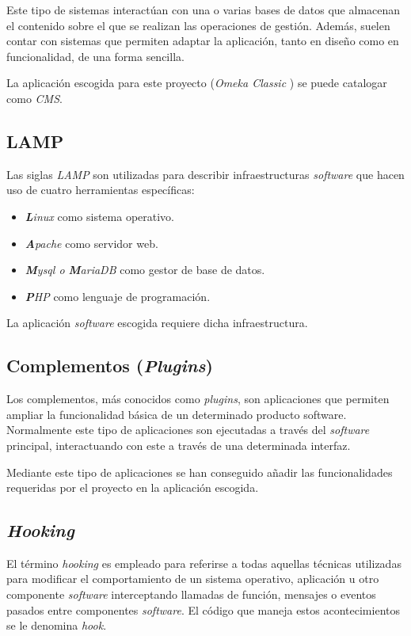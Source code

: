 Este tipo de sistemas interactúan con una o varias bases de datos que almacenan el contenido sobre el que se realizan las operaciones de gestión. Además, suelen contar con sistemas que permiten adaptar la aplicación, tanto en diseño como en funcionalidad, de una forma sencilla.

La aplicación escogida para este proyecto (\emph{Omeka Classic} \cite{omeka:web}) se puede catalogar como \emph{CMS}.

\subsection{LAMP}

Las siglas \emph{LAMP} \cite{wiki:lamp} son utilizadas para describir infraestructuras
\emph{software} que hacen uso de cuatro herramientas específicas:

\begin{itemize}
\tightlist
\item
  \emph{\textbf{L}inux} como sistema operativo.
\item
  \emph{\textbf{A}pache} como servidor web.
\item
  \emph{\textbf{M}ysql o \textbf{M}ariaDB} como gestor de base de datos.
\item
  \emph{\textbf{P}HP} como lenguaje de programación.
\end{itemize}

La aplicación \emph{software} escogida requiere dicha infraestructura.

\subsection{Complementos (\emph{Plugins})}

Los complementos, más conocidos como \emph{plugins}, son aplicaciones
que permiten ampliar la funcionalidad básica de un determinado producto
software. Normalmente este tipo de aplicaciones son ejecutadas a través
del \emph{software} principal, interactuando con este a través de una
determinada interfaz.

Mediante este tipo de aplicaciones se han conseguido añadir las funcionalidades
requeridas por el proyecto en la aplicación escogida.

\subsection{\emph{Hooking}}

El término \emph{hooking} \cite{wiki:hook} es empleado para referirse a todas aquellas
técnicas utilizadas para modificar el comportamiento de un sistema
operativo, aplicación u otro componente \emph{software} interceptando
llamadas de función, mensajes o eventos pasados entre componentes
\emph{software}. El código que maneja estos acontecimientos se le
denomina \emph{hook}.


